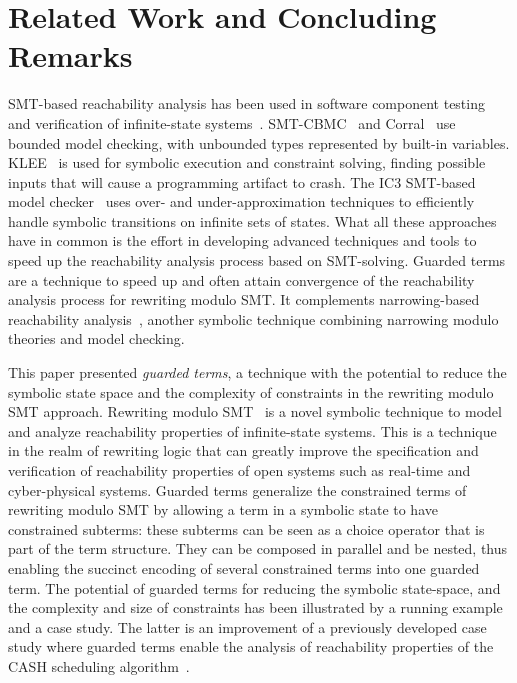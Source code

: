 
\section{Related Work and Concluding Remarks}
\label{sec.concl}

SMT-based reachability analysis has been used in software component
testing and verification of infinite-state
systems~\cite{cadar-seswtesting2013}.
SMT-CBMC~\cite{armando2009bounded} and Corral~\cite{corral} use
bounded model checking, with unbounded types represented by built-in
variables. KLEE~\cite{klee} is used for symbolic execution and
constraint solving, finding possible inputs that will cause a
programming artifact to crash.  The {IC3} SMT-based model
checker~\cite{cimatti-ic32012} uses over- and under-approximation
techniques to efficiently handle symbolic transitions on infinite sets
of states. What all these approaches have in common is the effort in
developing advanced techniques and tools to speed up the reachability
analysis process based on SMT-solving. Guarded terms are a technique
to speed up and often attain convergence of the reachability analysis
process for rewriting modulo SMT.
%
It complements
narrowing-based reachability
analysis~\cite{abstract-lmc-bae,meseguer-narrowing-2007}, another
symbolic technique combining narrowing modulo theories and model
checking.

This paper presented \textit{guarded terms}, a technique with the
potential to reduce the symbolic state space and the complexity of
constraints in the rewriting modulo SMT approach. Rewriting modulo
SMT~\cite{rocha-rewsmtjlamp-2017} is a novel symbolic technique to
model and analyze reachability properties of infinite-state
systems. This is a technique in the realm of rewriting logic that can
greatly improve the specification and verification of reachability
properties of open systems such as real-time and cyber-physical
systems. Guarded terms generalize the constrained terms of rewriting
modulo SMT by allowing a term in a symbolic state to have constrained
subterms: these subterms can be seen as a choice operator that is part
of the term structure. They can be composed in parallel and be nested,
thus enabling the succinct encoding of several constrained terms into
one guarded term.  The potential of guarded terms for reducing the
symbolic state-space, and the complexity and size of constraints has
been illustrated by a running example and a case study. The latter is
an improvement of a previously developed case study where guarded
terms enable the analysis of reachability properties of the CASH
scheduling algorithm~\cite{caccamo2000capacity}.

